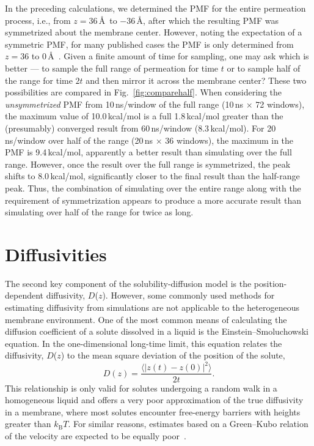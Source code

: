 \par In the preceding calculations, we determined the PMF for the entire permeation process, i.e., from $z=36$\,\AA~to $-36$\,\AA, after which the resulting PMF was symmetrized about the membrane center.  However, noting the expectation of a symmetric PMF, for many published cases the PMF is only determined from $z=36$ to 0\,\AA~\cite{Marrink1996,Bemporad2004,Holland2012}.  Given a finite amount of time for sampling, one may ask which is better --- to sample the full range of permeation for time $t$ or to sample half of the range for time $2t$ and then mirror it across the membrane center?  These two possibilities are compared in Fig.~\ref{fig:comparehalf}.  When considering the {\it unsymmetrized} PMF from 10\,ns/window of the full range (10\,ns $\times$ 72 windows), the maximum value of 10.0\,kcal/mol is a full 1.8\,kcal/mol greater than the (presumably) converged result from 60\,ns/window (8.3\,kcal/mol).  For 20\,ns/window over half of the range (20\,ns $\times$ 36 windows), the maximum in the PMF is 9.4\,kcal/mol, apparently a better result than simulating over the full range.  However, once the result over the full range is symmetrized, the peak shifts to 8.0\,kcal/mol, significantly closer to the final result than the half-range peak.  Thus, the combination of simulating over the entire range along with the requirement of symmetrization appears to produce a more accurate result than simulating over half of the range for twice as long.


\section{Diffusivities}
\par The second key component of the solubility-diffusion model is the position-dependent diffusivity, $D$($z$). However, some commonly used methods for estimating diffusivity from simulations are not applicable to the heterogeneous membrane environment. One of the most common means of calculating the diffusion coefficient of a solute dissolved in a liquid is the Einstein--Smoluchowski equation. In the one-dimensional long-time limit, this equation relates the diffusivity, $D$($z$) to the mean square deviation of the position of the solute,
\begin{equation}
D(z) = \frac{\langle \left| z(t) - z(0) \right|^2 \rangle}{2t}.
\label{eq:einstein-smoluchowski}
\end{equation}
This relationship is only valid for solutes undergoing a random walk in a homogeneous liquid and offers a very poor approximation of the true diffusivity in a membrane, where most solutes encounter free-energy barriers with heights greater than $k_\mathrm{B} T$. For similar reasons, estimates based on a Green--Kubo relation of the velocity are expected to be equally poor~\cite{Mamonov2006}.

